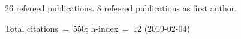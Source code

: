 26 refereed publications. 8 refeered publications as first author.

Total citations~=~550; h-index~=~12 (2019-02-04)